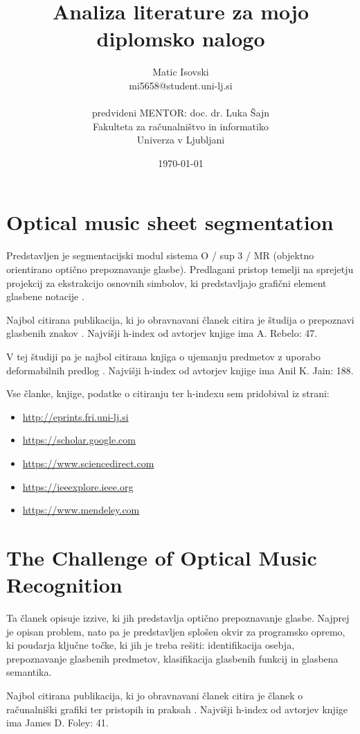 \documentclass[11pt,a4paper]{article}
\title{Analiza literature za mojo diplomsko nalogo}
\author{Matic Isovski\\
mi5658@student.uni-lj.si\\
\ \\
predvideni MENTOR: doc. dr. Luka Šajn \\
Fakulteta za računalništvo in informatiko\\ 
Univerza v Ljubljani
\date{\today}         
}
\begin{document}
\maketitle

\section{Optical music sheet segmentation}

Predstavljen je segmentacijski modul sistema O / sup 3 / MR (objektno orientirano optično prepoznavanje glasbe). Predlagani pristop temelji na sprejetju projekcij za ekstrakcijo osnovnih simbolov, ki predstavljajo grafični element glasbene notacije \cite{omss}.

Najbol citirana publikacija, ki jo obravnavani članek citira je študija o prepoznavi glasbenih znakov \cite{orms}. Najvišji h-index od avtorjev knjige ima A. Rebelo: 47.

V tej študiji pa je najbol citirana knjiga o ujemanju predmetov z uporabo deformabilnih predlog \cite{omudt}. Najvišji h-index od avtorjev knjige ima Anil K. Jain: 188.

Vse članke, knjige, podatke o citiranju ter h-indexu sem pridobival iz strani:
\begin{itemize}
\item
\url{http://eprints.fri.uni-lj.si}
\item
\url{https://scholar.google.com}
\item
\url{https://www.sciencedirect.com}
\item
\url{https://ieeexplore.ieee.org}
\item
\url{https://www.mendeley.com}
\end{itemize}


\section{The Challenge of Optical Music Recognition}

Ta članek \cite{tcomr} opisuje izzive, ki jih predstavlja optično prepoznavanje glasbe. Najprej je opisan problem, nato pa je predstavljen splošen okvir za programsko opremo, ki poudarja ključne točke, ki jih je treba rešiti: identifikacija osebja, prepoznavanje glasbenih predmetov, klasifikacija glasbenih funkcij in glasbena semantika.

Najbol citirana publikacija, ki jo obravnavani članek citira je članek o računalniški grafiki ter pristopih in praksah \cite{cgpp}. Najvišji h-index od avtorjev knjige ima James D. Foley: 41.
\end{document}
